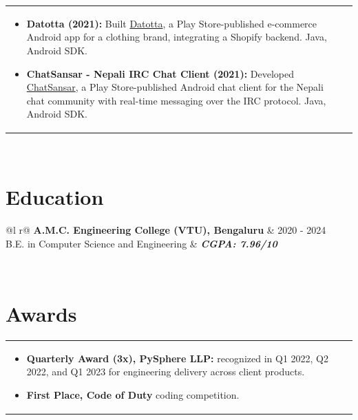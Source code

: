 \documentclass[a4paper,8pt]{article}
\begin{document}
\begin{tabularx}{\linewidth}{ @{}l r@{} }
\begin{minipage}[t]{\linewidth}
\begin{itemize}[nosep,after=\strut, leftmargin=2em, itemsep=2pt]
        \item \textbf{Datotta (2021):} Built \href{https://play.google.com/store/apps/details?id=com.datotta}{Datotta}, a Play Store-published e-commerce Android app for a clothing brand, integrating a Shopify backend. Java, Android SDK.
        \item \textbf{ChatSansar - Nepali IRC Chat Client (2021):} Developed \href{https://play.google.com/store/apps/details?id=com.chatsansar.android}{ChatSansar}, a Play Store-published Android chat client for the Nepali chat community with real-time messaging over the IRC protocol. Java, Android SDK.
    \end{itemize}
    \end{minipage}
\end{tabularx}\\[3pt]

\section{Education}
\begin{tabularx}{\linewidth}{ @{}l r@{} }
\color[HTML]{1C033C} \textbf{A.M.C. Engineering College (VTU), Bengaluru} & \hfill \color[HTML]{371e77} 2020 - 2024 \\
\color[HTML]{371e77} B.E. in Computer Science and Engineering & \hfill \color[HTML]{4B28A4} \textit{\textbf{CGPA: 7.96/10}} \\
\end{tabularx}\\[3pt]

\section{Awards}
\begin{tabularx}{\linewidth}{ @{}l r@{} }
\begin{minipage}[t]{\linewidth}
    \begin{itemize}[nosep,after=\strut, leftmargin=2em, itemsep=2pt]
        \item \textbf{Quarterly Award (3x), PySphere LLP:} recognized in Q1 2022, Q2 2022, and Q1 2023 for engineering delivery across client products.
        \item \textbf{First Place, Code of Duty} coding competition.
    \end{itemize}
\end{minipage}
\end{tabularx}
\end{document}
